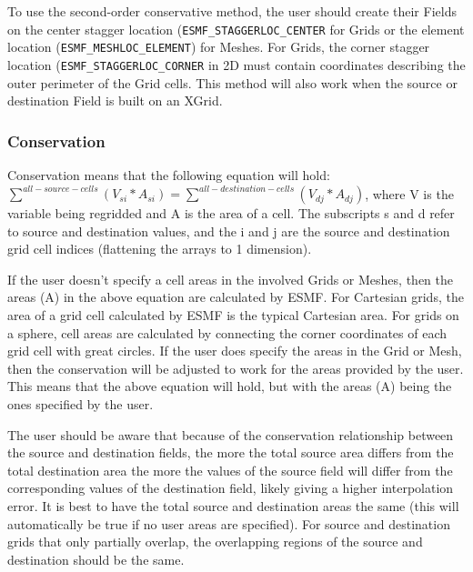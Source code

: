 \smallskip

 To use the second-order conservative method, the user should create their Fields on the center 
 stagger location ({\tt ESMF\_STAGGERLOC\_CENTER} for Grids  or the element location ({\tt ESMF\_MESHLOC\_ELEMENT}) for Meshes.
 For Grids, the corner stagger location ({\tt ESMF\_STAGGERLOC\_CORNER} in 2D must contain coordinates describing the outer perimeter of the Grid cells. 
 This method will also work when the source or destination Field is built on an XGrid.

\subsubsection{Conservation}\label{sec:interpolation:conservation}
 Conservation means that the following equation will hold:  $\sum^{all-source-cells}(V_{si}*A_{si}) = \sum^{all-destination-cells}(V_{dj}*A_{dj})$, where
 V is the variable being regridded and A is the area of a cell.  The subscripts s and d refer to source and destination values, and the i and j are the source  and destination grid cell indices (flattening the arrays to 1 dimension). 

 If the user doesn't specify a cell areas in the involved Grids or Meshes, then the areas (A) in the above equation are calculated by ESMF. 
 For Cartesian grids, the area of a grid cell calculated by ESMF is the typical Cartesian area. 
 For grids on a sphere, cell areas are calculated by connecting the corner coordinates of each grid cell with great circles. If the user 
 does specify the areas in the Grid or Mesh, then the conservation will be adjusted to work for the areas 
 provided by the user. This means that the above equation will hold, but with the areas (A) being the ones specified by the user.

 The user should be aware that because of the conservation relationship between the source and destination fields, the more the total source area
 differs from the total destination area the more the values of the source field will differ from the corresponding values of the destination field, 
 likely giving a higher interpolation error. It is best to have the total source and destination areas the same 
 (this will automatically be true if no user areas are specified). For source and destination grids 
 that only partially overlap, the overlapping regions of the source and destination should be the same.

